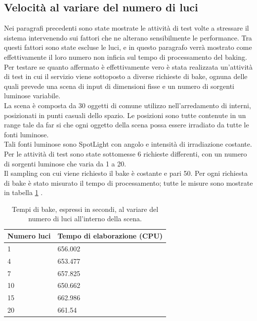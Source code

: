 \subsection{Velocità al variare del numero di luci}
\label{sec:chapter_prove_sperimentali_servizio_baking_vel_luci}

Nei paragrafi precedenti sono state mostrate le attività di test volte a stressare il sistema intervenendo sui fattori che ne alterano sensibilmente le performance. Tra questi fattori sono state escluse le luci, e in questo paragrafo verrà mostrato come effettivamente il loro numero non inficia sul tempo di processamento del baking.
\\
Per testare se quanto affermato è effettivamente vero è stata realizzata un’attività di test in cui il servizio viene sottoposto a diverse richieste di bake, ognuna delle quali prevede una scena di input di dimensioni fisse e un numero di sorgenti luminose variabile. 
\\
La scena è composta da 30 oggetti di comune utilizzo nell’arredamento di interni, posizionati in punti casuali dello spazio. Le posizioni sono tutte contenute in un range tale da far si che ogni oggetto della scena possa essere irradiato da tutte le fonti luminose. 
\\
Tali fonti  luminose sono SpotLight con angolo e intensità di irradiazione costante. Per le attività di test sono state sottomesse 6 richieste differenti, con un numero di sorgenti luminose che varia da 1 a 20.
\\
Il sampling con cui viene richiesto il bake è costante e pari 50. 
Per ogni richiesta di bake è stato misurato il tempo di processamento; tutte le misure sono mostrate in tabella \ref{table:per_luci} .

\begin{table}[]
\centering
\caption[Performance al variare delle luci]{Tempi di bake, espressi in secondi, al variare del numero di luci all'interno della scena.}
\begin{tabular}{|l|l|}
\hline
\textbf{Numero luci} & \textbf{Tempo di elaborazione (CPU)} \\ \hline
1 & 656.002 \\ \hline
4 & 653.477 \\ \hline
7 & 657.825 \\ \hline
10 & 650.662 \\ \hline
15 & 662.986 \\ \hline
20 & 661.54 \\ \hline
\end{tabular}
\label{table:per_luci}
\end{table}

